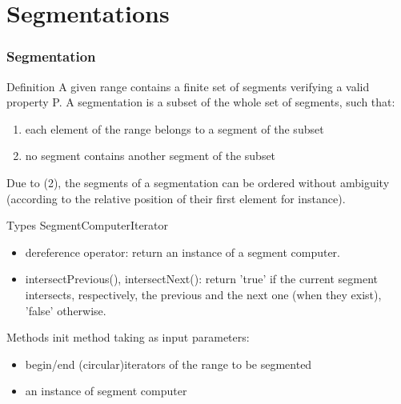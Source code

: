 
\section{Segmentations}

\begin{frame}
  \frametitle{Segmentation}
 
  \begin{block}{Definition}
A given range contains a finite set of segments verifying a valid property P. A segmentation is a subset of the whole set of segments, such that:
\begin{enumerate}
 \item each element of the range belongs to a segment of the subset
 \item no segment contains another segment of the subset 
\end{enumerate}
Due to (2), the segments of a segmentation can be ordered without ambiguity (according to the relative position of their first element for instance).
  \end{block}


  \begin{block}{Types}
SegmentComputerIterator
 \begin{itemize}
  \item dereference operator: return an instance of a segment computer.
  \item intersectPrevious(), intersectNext(): return 'true' if the current segment intersects, respectively, the previous and the next one (when they exist), 'false' otherwise.
 \end{itemize}
  \end{block}

  \begin{block}{Methods}
init method taking as input parameters: 
\begin{itemize}
 \item begin/end (circular)iterators of the range to be segmented
 \item an instance of segment computer
\end{itemize}
  \end{block}

\end{frame}


